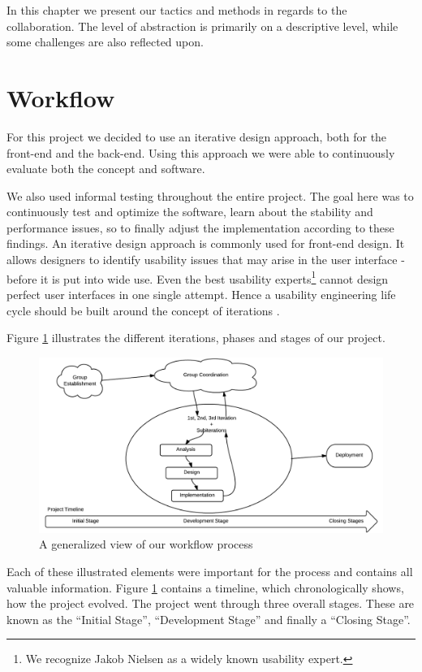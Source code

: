 In this chapter we present our tactics and methods in regards to the collaboration. The level of abstraction is primarily on a descriptive level, while some challenges are also reflected upon. 

\section{Workflow} \label{sec:workflow}
For this project we decided to use an iterative design approach, both for the front-end and the back-end. Using this approach we were able to continuously evaluate both the concept and software.

We also used informal testing throughout the entire project. The goal here was to continuously test and optimize the software, learn about the stability and performance issues, so to finally adjust the implementation according to these findings.  An iterative design approach is commonly used for front-end design. It allows designers to identify usability issues that may arise in the user interface - before it is put into wide use. Even the best usability experts\footnote{We recognize Jakob Nielsen as a widely known usability expert.} cannot design perfect user interfaces in one single attempt. Hence a usability engineering life cycle should be built around the concept of iterations \cite{Nielsen1993}.

Figure \ref{fig:workflow} illustrates the different iterations, phases and stages of our project.

\begin{figure}[ht]
\centering
\includegraphics[width=\columnwidth]{images/workflow.png}
\caption{A generalized view of our workflow process}
\label{fig:workflow}
\end{figure}

Each of these illustrated elements were important for the process and contains all valuable information. Figure \ref{fig:workflow} contains a timeline, which chronologically shows, how the project evolved. The project went through three overall stages. These are known as the ``Initial Stage'', ``Development Stage'' and finally a ``Closing Stage''.


